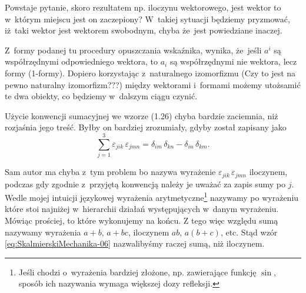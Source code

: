 \documentclass[a4paper,11pt]{article}
\begin{document}
Powstaje pytanie, skoro rezultatem np. iloczynu wektorowego, jest wektor to
w~którym miejscu jest on zaczepiony? W~takiej sytuacji będziemy pryzmować,
iż~taki wektor jest wektorem swobodnym, chyba że~jest powiedziane inaczej.

\vspace{\spaceFour}



 Z~formy podanej tu procedury opuszczania wskaźnika, wynika,
że~jeśli $a^{ i }$ są współrzędnymi odpowiedniego wektora, to $a_{ i }$ są
współrzędnymi nie wektora, lecz formy (1-formy). Dopiero korzystając
z~naturalnego izomorfizmu (Czy to jest na pewno naturalny izomorfizm???)
między wektorami i~formami możemy utożsamić te dwa obiekty, co będziemy
w~dalszym ciągu czynić.

\vspace{\spaceFour}



 Użycie konwencji sumacyjnej we wzorze (1.26) chyba bardzie zaciemnia, niż rozjaśnia jego treść. Byłby on bardziej zrozumiały, gdyby został zapisany jako
\begin{equation}
  \label{eq:SkalmierskiMechanika-06}
  \sum_{ j = 1 }^{ 3 } \varepsilon_{ j i k } \, \varepsilon_{ j m n }
  = \delta_{ i m } \, \delta_{ k n } - \delta_{ i n } \, \delta_{ k m }.
\end{equation}

Sam autor ma chyba z~tym problem bo nazywa wyrażenie
$\varepsilon_{ j i k } \, \varepsilon_{ j m n }$ iloczynem, podczas gdy zgodnie z~przyjętą
konwencją należy je uważać za zapis sumy po $j$. Wedle mojej intuicji
językowej wyrażenia arytmetyczne\footnote{Jeśli chodzi o~wyrażenia bardziej
  złożone, np. zawierające funkcję $\sin$, sposób ich nazywania wymaga
  większej dozy refleksji.} nazywamy po wyrażeniu które stoi najniżej
w~hierarchii działań występujących w~danym wyrażeniu. Mówiąc prościej,
to które wykonujemy na końcu. Z tego więc względu sumą nazywamy wyrażenia
$a + b$, $a + bc$, iloczynem $ab$, $a ( b + c )$, etc. Stąd wzór
\eqref{eq:SkalmierskiMechanika-06} nazwalibyśmy raczej sumą, niż iloczynem.
\end{document}

